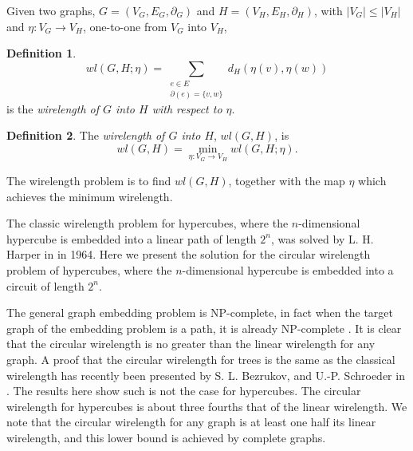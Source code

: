 \documentclass[12pt]{ucthesis}
\theoremstyle{plain}
\theoremstyle{definition}
\newtheorem{definition}{Definition}
\begin{document}
Given two graphs, $G = (V_G, E_G, \partial_G)$ and $H = (V_H, E_H, \partial_H)$,
with $|V_G| \le |V_H|$ and $\eta \colon V_G \rightarrow V_H$,
one-to-one from $V_G$ into $V_H$,
\begin{definition}
\label{Definition 2}
\begin{equation*}
wl(G, H; \eta) = \sum_{\substack{
	e \in E \\
	\partial(e) = \{v, w\}
}} d_H(\eta(v), \eta(w))
\end{equation*}
is the \emph{wirelength of $G$ into $H$ with respect to $\eta$}.
\end{definition}
\begin{definition}
\label{Definition 3}
The \emph{wirelength of $G$ into $H$}, $wl(G, H)$, is
\begin{equation*}
wl(G, H) = \min_{\eta \colon V_G \rightarrow V_H} wl(G, H; \eta).
\end{equation*}
\end{definition}

The wirelength problem is to find $wl(G, H)$,
together with the map $\eta$ which achieves the minimum wirelength.

The classic wirelength problem for hypercubes,
where the $n$-dimensional hypercube is embedded into a linear path of length $2^n$,
was solved by L. H. Harper in \cite{Harper.1964} in 1964.
Here we present the solution for the circular wirelength problem of hypercubes,
where the $n$-dimensional hypercube is embedded into a circuit of length $2^n$.

The general graph embedding problem is NP-complete,
in fact when the target graph of the embedding problem is a path,
it is already NP-complete \cite{Garey.1979}.
It is clear that the circular wirelength is no greater than the linear wirelength for any graph.
A proof that the circular wirelength for trees is the same as the classical wirelength
has recently been presented by S. L. Bezrukov, and U.-P. Schroeder in \cite{Bezrukov.1998}.
The results here show such is not the case for hypercubes.
The circular wirelength for hypercubes is about three fourths that of the linear wirelength.
We note that the circular wirelength for any graph is at least one half its linear wirelength,
and this lower bound is achieved by complete graphs.

\end{document}
